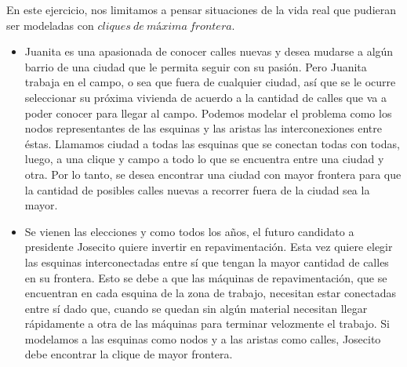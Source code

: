 En este ejercicio, nos limitamos a pensar situaciones de la vida real que pudieran ser modeladas con $cliques\ de\ máxima\ frontera$.
\begin{itemize}
\item Juanita es una apasionada de conocer calles nuevas y desea mudarse a algún barrio de una ciudad que le permita seguir con su pasión. Pero Juanita trabaja en el campo, o sea que fuera de cualquier ciudad, así que se le ocurre seleccionar su próxima vivienda de acuerdo a la cantidad de calles que va a poder conocer para llegar al campo. Podemos modelar el problema como los nodos representantes de las esquinas y las aristas las interconexiones entre éstas. Llamamos ciudad a todas las esquinas que se conectan todas con todas, luego, a una clique y campo a todo lo que se encuentra entre una ciudad y otra. Por lo tanto, se desea encontrar una ciudad con mayor frontera para que la cantidad de posibles calles nuevas a recorrer fuera de la ciudad sea la mayor.

\item Se vienen las elecciones y como todos los años, el futuro candidato a presidente Josecito quiere invertir en repavimentación. Esta vez quiere elegir las esquinas interconectadas entre sí que tengan la mayor cantidad de calles en su frontera. Esto se debe a que las máquinas de repavimentación, que se encuentran en cada esquina de la zona de trabajo, necesitan estar conectadas entre sí dado que, cuando se quedan sin algún material necesitan llegar rápidamente a otra de las máquinas para terminar velozmente el trabajo. Si modelamos a las esquinas como nodos y a las aristas como calles, Josecito debe encontrar la clique de mayor frontera. 
\end{itemize}
